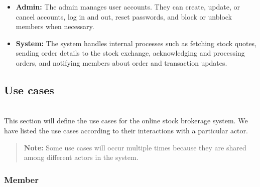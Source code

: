 \begin{itemize}
\item
\protect{}\label{YdmqKKaXcsiicKPx2FOMO}
\textbf{Admin:} The admin manages user accounts. They can create, update, or cancel accounts, log in and out, reset passwords, and block or unblock members when necessary.
\item
\protect{}\label{-ptAS0NOQC9Mz61vlqnvF}
\textbf{System:} The system handles internal processes such as fetching stock quotes, sending order details to the stock exchange, acknowledging and processing orders, and notifying members about order and transaction updates.
\end{itemize}

\subsection{Use cases}\label{02pb5CeINxwiomb2H183V}
\\
This section will define the use cases for the online stock brokerage system. We have listed the use cases according to their interactions with a particular actor.
\begin{quote}
\textbf{Note:} Some use cases will occur multiple times because they are shared among different actors in the system.
\end{quote}
\subsubsection{Member}\label{0qLD4kbR7BZwhXZGSQpfA}

